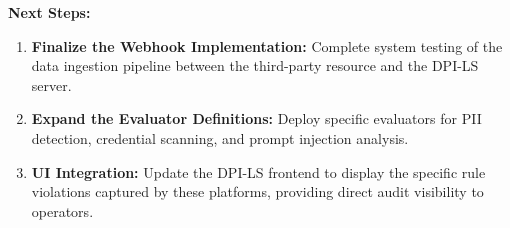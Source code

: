 \documentclass[11pt,a4paper]{article}
\begin{document}
\textbf{Next Steps:}
\begin{enumerate}
    \item \textbf{Finalize the Webhook Implementation:} Complete system testing of the data ingestion pipeline between the third-party resource and the DPI-LS server.
    \item \textbf{Expand the Evaluator Definitions:} Deploy specific evaluators for PII detection, credential scanning, and prompt injection analysis.
    \item \textbf{UI Integration:} Update the DPI-LS frontend to display the specific rule violations captured by these platforms, providing direct audit visibility to operators.
\end{enumerate}
\end{document}
